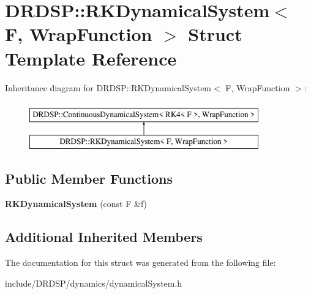 \hypertarget{struct_d_r_d_s_p_1_1_r_k_dynamical_system}{\section{D\-R\-D\-S\-P\-:\-:R\-K\-Dynamical\-System$<$ F, Wrap\-Function $>$ Struct Template Reference}
\label{struct_d_r_d_s_p_1_1_r_k_dynamical_system}
}
Inheritance diagram for D\-R\-D\-S\-P\-:\-:R\-K\-Dynamical\-System$<$ F, Wrap\-Function $>$\-:\begin{figure}[H]
\begin{center}
\leavevmode
\includegraphics[height=2.000000cm]{struct_d_r_d_s_p_1_1_r_k_dynamical_system}
\end{center}
\end{figure}
\subsection*{Public Member Functions}
\begin{DoxyCompactItemize}
\item 
\hypertarget{struct_d_r_d_s_p_1_1_r_k_dynamical_system_ac4fddbaa65ce84accc167fc446fcfac7}{{\bfseries R\-K\-Dynamical\-System} (const F \&f)}\label{struct_d_r_d_s_p_1_1_r_k_dynamical_system_ac4fddbaa65ce84accc167fc446fcfac7}

\end{DoxyCompactItemize}
\subsection*{Additional Inherited Members}


The documentation for this struct was generated from the following file\-:\begin{DoxyCompactItemize}
\item 
include/\-D\-R\-D\-S\-P/dynamics/dynamical\-System.\-h\end{DoxyCompactItemize}
